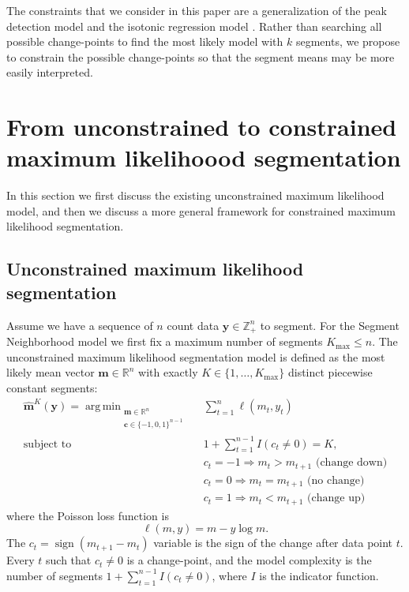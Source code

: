 \documentclass{article}
\DeclareMathOperator*{\argmin}{arg\,min}
\DeclareMathOperator*{\sign}{sign}
\newcommand{\ZZ}{\mathbb Z}
\newcommand{\RR}{\mathbb R}
\begin{document}
The constraints that we consider in this paper are a generalization of
the peak detection model \citep{PeakSeg} and the isotonic regression
model \citep{mair2009isotone}. Rather than searching all possible
change-points to find the most likely model with $k$ segments, we
propose to constrain the possible change-points so that the segment
means may be more easily interpreted.

\section{From unconstrained to constrained maximum likelihoood
  segmentation}
\label{sec:model}

In this section we first discuss the existing unconstrained maximum
likelihood model, and then we discuss a more general framework for
constrained maximum likelihood segmentation.

\subsection{Unconstrained maximum likelihood segmentation}

Assume we have a sequence of $n$ count data $\mathbf y\in\ZZ_+^n$ to
segment. For the Segment Neighborhood model we first fix a maximum
number of segments $ K_{\max}\leq n$. The unconstrained maximum
likelihood segmentation model is defined as the most likely mean
vector $\mathbf m\in\RR^n$ with exactly 
$K\in\{1, \dots, K_{\max}\}$ distinct piecewise constant segments:
\begin{align}
  \label{unconstrained}
  \mathbf{\hat m}^K(\mathbf y) =
    \argmin_{\substack{
  \mathbf m\in\RR^{n}
\\
  \mathbf c\in\{-1,0,1\}^{n-1}
  }} &\ \ 
    \sum_{t=1}^n \ell( m_t,  y_t) 
\\
    \text{subject to} &\ \  1+\sum_{t=1}^{n-1} I(c_t \neq 0) = K, 
\nonumber\\
& \ \ c_t = -1 \Rightarrow m_{t} > m_{t+1} \text{ (change down)}
\nonumber\\
& \ \ c_t = 0 \Rightarrow m_{t} = m_{t+1}  \text{ (no change)}
\nonumber\\
& \ \ c_t = 1 \Rightarrow m_{t} < m_{t+1} \text{ (change up)}
\nonumber
\end{align}
where the Poisson loss function is
\begin{equation}\label{eq:loss}
  \ell( m,  y)= m - y \log m.
\end{equation} 
The $c_t = \sign(m_{t+1} - m_{t})$ variable is the sign of the change
after data point $t$. Every $t$ such that $c_t \neq 0$ is a
change-point, and the model complexity is the number of segments
$1+\sum_{t=1}^{n-1} I(c_t \neq 0)$, where $I$ is the indicator function.
\end{document}
